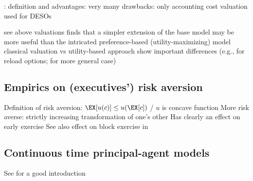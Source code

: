     \cite{huang2013dynamic}:
        definition and 
        advantages: very many
        drawbacks: only accounting cost
        valuation used for DESOs

    see above valuations 
    \cite{carpenter1998exercise} finds that a simpler extension of the base model may be more useful than the intricated preference-based (utility-maximizing) model
    classical valuation vs utility-based approach show important differences (e.g., \cite{lau2005valuation} for reload options; \cite{ingersoll2006subjective} for more general case)


 



\subsection{Empirics on (executives') risk aversion} %
    Definition of risk aversion: $\EX[u(c)] \le u(\EX[c])$ / $u$ is concave function
    More risk averse: strictly increasing transformation of one's other
    Has clearly an effect on early exercise \cite{izhakian2017risk} \cite{murphy2019employees}
    See also effect on block exercise in \cite{grasselli2009risk}





\subsection{Continuous time principal-agent models} %
    See \cite{cvitanic2013dynamics} for a good introduction




